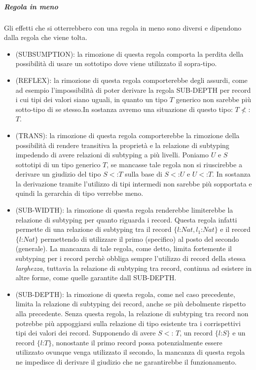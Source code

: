 \subparagraph*{Regola in meno}

Gli effetti che si otterrebbero con una regola in meno sono diversi e dipendono dalla regola che viene tolta.
\begin{itemize}
\item (SUBSUMPTION): la rimozione di questa regola comporta la perdita della possibilit\`a di usare un sottotipo dove viene utilizzato il sopra-tipo.
\item (REFLEX): la rimozione di questa regola comporterebbe degli assurdi, come ad esempio l'impossibilit\`a di poter derivare la regola SUB-DEPTH per record i cui tipi dei valori siano uguali, in quanto un tipo $T$ generico non sarebbe pi\`u sotto-tipo di se stesso.In sostanza avremo una situazione di questo tipo: $T \not <$: $T$.
\item (TRANS):  la rimozione di questa regola comporterebbe la rimozione della possibilit\`a di rendere transitiva la propriet\`a e la relazione di subtyping impedendo di avere relazioni di subtyping a pi\`u livelli. Poniamo $U$ e $S$ sottotipi di un tipo generico $T$, se mancasse tale regola non si riuscirebbe a derivare un giudizio del tipo $S<$:$T$ sulla base di $S <$:$U$ e $U<$:$T$. In sostanza la derivazione tramite l'utilizzo di tipi intermedi non sarebbe pi\`u sopportata e quindi la gerarchia di tipo verrebbe meno.
\item (SUB-WIDTH):
la rimozione di questa regola renderebbe limiterebbe la relazione di subtyping per quanto riguarda i record. Questa regola infatti permette di una relazione di subtyping tra il record $\{l$:$Nat,l_1$:$Nat\}$ e il record $\{l$:$Nat\}$ permettendo di utilizzare il primo (specifico) al posto del secondo (generale). La mancanza di tale regola, come detto, limita fortemente il subtyping per i record perch\`e obbliga sempre l'utilizzo di record della stessa \emph{larghezza}, tuttavia la relazione di subtyping tra record, continua ad esistere in altre forme, come quelle garantite dall SUB-DEPTH.
\item (SUB-DEPTH): 
la rimozione di questa regola, come nel caso precedente, limita la relazione di subtyping dei record, anche se pi\`u debolmente rispetto alla precedente. Senza questa regola, la relazione di subtyping tra record non potrebbe pi\`u appoggiarsi sulla relazione di tipo esistente tra i corrispettivi tipi dei valori dei record. Supponendo di avere $S <$: $T$, un record   $\{l$:$S\}$ e un record $\{l$:$T\}$, nonostante il primo record possa potenzialmente essere utilizzato ovunque venga utilizzato il secondo, la mancanza di questa regola ne impedisce di derivare il giudizio che ne garantirebbe il funzionamento.

\end{itemize}
